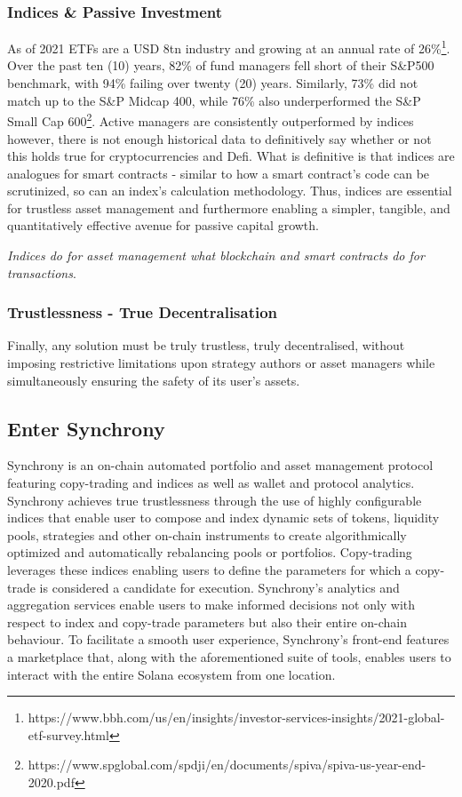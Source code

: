 \documentclass[10pt]{article}
\begin{document}
					\subsubsection{Indices \& Passive Investment}
					As of 2021 ETFs are a USD 8tn industry and growing at an annual rate of
					26\%\footnote[7]{https://www.bbh.com/us/en/insights/investor-services-insights/2021-global-etf-survey.html}.
					Over the past ten (10) years, 82\% of fund managers fell short of their S\&P500
					benchmark, with 94\% failing over twenty (20) years. Similarly, 73\% did not
					match up to the S\&P Midcap 400, while 76\% also underperformed the S\&P Small
					Cap
					600\footnote[8]{https://www.spglobal.com/spdji/en/documents/spiva/spiva-us-year-end-2020.pdf}.
					Active managers are consistently outperformed by indices however, there is not
					enough historical data to definitively say whether or not this holds true for
					cryptocurrencies and Defi. What is definitive is that indices are analogues for
					smart contracts - similar to how a smart contract's code can be scrutinized, so
					can an index's calculation methodology. Thus, indices are essential for
					trustless asset management and furthermore enabling a simpler, tangible, and
					quantitatively effective avenue for passive capital growth.\\
					\begin{center}
						\emph{Indices do for asset management what blockchain and smart contracts do for transactions}.
					\end{center}
					\subsubsection{Trustlessness - True Decentralisation}
					Finally, any solution must be truly trustless, truly decentralised, without
					imposing restrictive limitations upon strategy authors or asset managers while
					simultaneously ensuring the safety of its user's assets.
					\subsection{Enter Synchrony}
					Synchrony is an on-chain automated portfolio and asset management protocol
					featuring copy-trading and indices as well as wallet and protocol analytics.
					Synchrony achieves true trustlessness through the use of highly configurable
					indices that enable user to compose and index dynamic sets of tokens, liquidity
					pools, strategies and other on-chain instruments to create algorithmically
					optimized and automatically rebalancing pools or portfolios. Copy-trading
					leverages these indices enabling users to define the parameters for which
					a copy-trade is considered a candidate for execution. Synchrony's analytics and
					aggregation services enable users to make informed decisions not only with
					respect to index and copy-trade parameters but also their entire on-chain
					behaviour. To facilitate a smooth user experience, Synchrony's front-end features
					a marketplace that, along with the aforementioned suite of tools, enables users
					to interact with the entire Solana ecosystem from one location.
\end{document}
